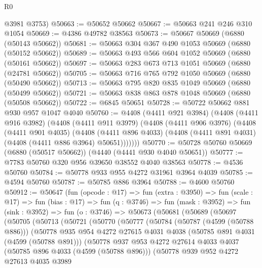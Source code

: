 \begin{lexlean}{R0}
\begin{coremodule}
      @3981
      @3753)
@50663 := @50652 @50662
@50667 := @50663 @241 @246 @310 @1054
@50669 := @4386 @49782 @38563
@50673 := @50667 @50669 (@6880 (@50143 @50662))
@50681 := @50663 @304 @367 @490 @1053 @50669 (@6880 (@50152 @50662))
@50689 := @50663 @493 @566 @604 @1052 @50669 (@6880 (@50161 @50662))
@50697 := @50663 @283 @673 @713 @1051 @50669 (@6880 (@24781 @50662))
@50705 := @50663 @716 @765 @792 @1050 @50669 (@6880 (@50490 @50662))
@50713 := @50663 @795 @820 @835 @1049 @50669 (@6880 (@50499 @50662))
@50721 := @50663 @838 @863 @878 @1048 @50669 (@6880 (@50508 @50662))
@50722 := @6845 @50651
@50728 := @50722 @50662 @881 @930 @957 @1047 @4040
@50760 := @4408
    (@4411 @921 @3984)
    (@4408
      (@4411 @916 @3982)
      (@4408
        (@4411 @911 @3979)
        (@4408
          (@4411 @906 @3976)
          (@4408
            (@4411 @901 @4035)
            (@4408
              (@4411 @896 @4033)
              (@4408 (@4411 @891 @4031) (@4408 (@4411 @886 @3964) @50651)))))))
@50770 := @50728 @50760 @50669 (@6880 (@50517 @50662)) (@4440 (@4441 @930 @4040 @50651))
@50777 := @7783 @50760 @320 @956 @39650 @38552 @4040 @38563
@50778 := @4536 @50760
@50784 := @50778 @933 @955 @4272 @31961 @3964 @4039
@50785 := @4594 @50760
@50787 := @50785 @886 @3964
@50788 := @4600 @50760
@50912 := @50647
    (fun (opcode : @17) =>
    fun (extra : @3950) =>
    fun (scale : @17) =>
    fun (bias : @17) =>
    fun (q : @3746) =>
    fun (mask : @3952) =>
    fun (sink : @3952) =>
    fun (o : @3746) =>
    @50673
      (@50681
        (@50689
          (@50697
            (@50705
              (@50713
                (@50721
                  (@50770
                    (@50777
                      (@50784
                        (@50787 (@4599 (@50788 @886)))
                        (@50778
                          @935
                          @954
                          @4272
                          @27615
                          @4031
                          @4038
                          (@50785 @891 @4031 (@4599 (@50788 @891)))
                          (@50778
                            @937
                            @953
                            @4272
                            @27614
                            @4033
                            @4037
                            (@50785 @896 @4033 (@4599 (@50788 @896)))
                            (@50778
                              @939
                              @952
                              @4272
                              @27613
                              @4035
                              @3989

\end{coremodule}
\end{lexlean}
